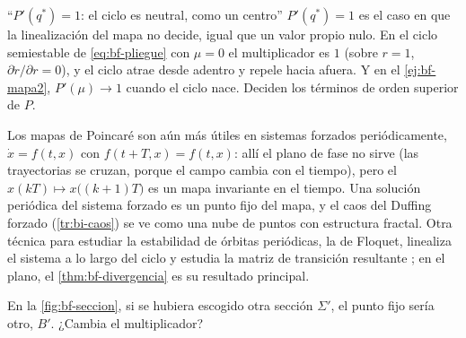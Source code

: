 \begin{trampa}[label=tr:bf-uno]{``$P'(q^*)=1$: el ciclo es neutral, como un centro''}
$P'(q^*)=1$ es el caso en que la linealización del mapa no decide, igual que un valor propio nulo. En el ciclo semiestable de \eqref{eq:bf-pliegue} con $\mu=0$ el multiplicador es $1$ (sobre $r=1$, $\partial\dot r/\partial r=0$), y el ciclo atrae desde adentro y repele hacia afuera. Y en el \cref{ej:bf-mapa2}, $P'(\mu)\to1$ cuando el ciclo nace. Deciden los términos de orden superior de $P$.
\end{trampa}

Los mapas de Poincaré son aún más útiles en sistemas forzados periódicamente, $\dot x=f(t,x)$ con $f(t+T,x)=f(t,x)$: allí el plano de fase no sirve (las trayectorias se cruzan, porque el campo cambia con el tiempo), pero el  $x(kT)\mapsto x\bigl((k+1)T\bigr)$ es un mapa invariante en el tiempo. Una solución periódica del sistema forzado es un punto fijo del mapa, y el caos del Duffing forzado (\cref{tr:bi-caos}) se ve como una nube de puntos con estructura fractal. Otra técnica para estudiar la estabilidad de órbitas periódicas, la de Floquet, linealiza el sistema a lo largo del ciclo y estudia la matriz de transición resultante \citep[cap.~7]{Sas99}; en el plano, el \cref{thm:bf-divergencia} es su resultado principal.

\begin{pausa}
En la \cref{fig:bf-seccion}, si se hubiera escogido otra sección $\Sigma'$, el punto fijo sería otro, $B'$. ¿Cambia el multiplicador?
\end{pausa}
